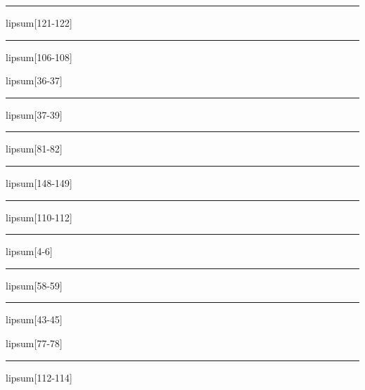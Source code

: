 \documentclass[11pt,a4paper]{article}
\begin{document}
\begin{simplewrap}
  \textcolor{orange!40}{\rule{3.2cm}{7.1cm}}
\end{simplewrap}
lipsum[121-122]

\begin{simplewrap}
  \textcolor{cyan!17}{\rule{5.6cm}{5.1cm}}
\end{simplewrap}
lipsum[106-108]

lipsum[36-37]

\begin{simplewrap}
  \textcolor{yellow!31}{\rule{4.2cm}{6.6cm}}
\end{simplewrap}
lipsum[37-39]

\begin{simplewrap}
  \textcolor{cyan!59}{\rule{3.2cm}{4.7cm}}
\end{simplewrap}
lipsum[81-82]

\begin{simplewrap}
  \textcolor{red!38}{\rule{3.8cm}{8.1cm}}
\end{simplewrap}
lipsum[148-149]

\begin{simplewrap}
  \textcolor{red!60}{\rule{5.3cm}{2.7cm}}
\end{simplewrap}
lipsum[110-112]

\begin{simplewrap}
  \textcolor{red!34}{\rule{3.0cm}{6.3cm}}
\end{simplewrap}
lipsum[4-6]

\begin{simplewrap}
  \textcolor{cyan!22}{\rule{3.1cm}{2.0cm}}
\end{simplewrap}
lipsum[58-59]

\begin{simplewrap}
  \textcolor{lime!29}{\rule{3.4cm}{5.1cm}}
\end{simplewrap}
lipsum[43-45]

lipsum[77-78]

\begin{simplewrap}
  \textcolor{violet!39}{\rule{5.2cm}{6.8cm}}
\end{simplewrap}
lipsum[112-114]
\end{document}
